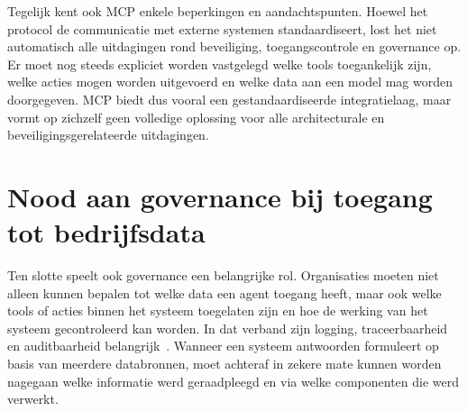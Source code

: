 Tegelijk kent ook \gls{MCP} enkele beperkingen en aandachtspunten. Hoewel het protocol de communicatie met externe systemen standaardiseert, lost het niet automatisch alle uitdagingen rond beveiliging, toegangscontrole en governance op. Er moet nog steeds expliciet worden vastgelegd welke tools toegankelijk zijn, welke acties mogen worden uitgevoerd en welke data aan een model mag worden doorgegeven. \gls{MCP} biedt dus vooral een gestandaardiseerde integratielaag, maar vormt op zichzelf geen volledige oplossing voor alle architecturale en beveiligingsgerelateerde uitdagingen.

\section{Nood aan governance bij toegang tot bedrijfsdata}
\label{sec:security}

Ten slotte speelt ook governance een belangrijke rol. Organisaties moeten niet alleen kunnen bepalen tot welke data een agent toegang heeft, maar ook welke tools of acties binnen het systeem toegelaten zijn en hoe de werking van het systeem gecontroleerd kan worden. In dat verband zijn logging, traceerbaarheid en auditbaarheid belangrijk~\cite{redhat2024mcpsecurity}. Wanneer een systeem antwoorden formuleert op basis van meerdere databronnen, moet achteraf in zekere mate kunnen worden nagegaan welke informatie werd geraadpleegd en via welke componenten die werd verwerkt.